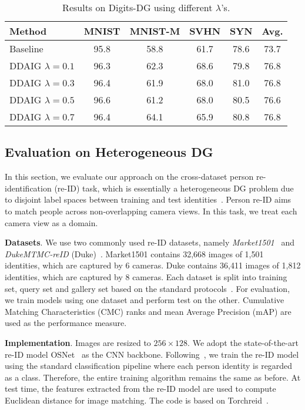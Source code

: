 \documentclass[letterpaper]{article}
\newcommand{\keypoint}[1]{\vspace{0.1cm}\noindent\textbf{#1}}
\newcommand{\tableCellHeight}{1.1}
\begin{document}
\begin{table}[t]
\setlength{\tabcolsep}{3.5pt}
\renewcommand{\arraystretch}{\tableCellHeight}
\centering
\footnotesize
\caption{Results on Digits-DG using different $\lambda$'s.}
\label{tab:impactOfLmda}
\begin{tabular}{l | c c c c | c}
\hline
Method & MNIST & MNIST-M & SVHN & SYN & Avg. \\
\hline
Baseline & 95.8 & 58.8 & 61.7 & 78.6 & 73.7 \\
DDAIG $\lambda=0.1$ & 96.3 & 62.3 & 68.6 & 79.8 & 76.8 \\
DDAIG $\lambda=0.3$ & 96.4 & 61.9 & 68.0 & 81.0 & 76.8 \\
DDAIG $\lambda=0.5$ & 96.6 & 61.2 & 68.0 & 80.5 & 76.6 \\
DDAIG $\lambda=0.7$ & 96.4 & 64.1 & 65.9 & 80.8 & 76.8 \\
\hline
\end{tabular}
\vspace{-0.3cm}
\end{table}

\subsection{Evaluation on Heterogeneous DG}
In this section, we evaluate our approach on the cross-dataset person re-identification (re-ID) task, which is essentially a heterogeneous DG problem due to disjoint label spaces between training and test identities~\cite{feature_critic}. Person re-ID aims to match people across non-overlapping camera views. In this task, we treat each camera view as a domain.

\keypoint{Datasets}.
We use two commonly used re-ID datasets, namely \emph{Market1501}~\cite{zheng2015scalable} and \emph{DukeMTMC-reID} (Duke)~\cite{ristani2016perform,zheng2017unlabeled}. Market1501 contains 32,668 images of 1,501 identities, which are captured by 6 cameras. Duke contains 36,411 images of 1,812 identities, which are captured by 8 cameras. Each dataset is split into training set, query set and gallery set based on the standard protocols~\cite{zheng2015scalable,zheng2017unlabeled}. For evaluation, we train models using one dataset and perform test on the other. Cumulative Matching Characteristics (CMC) ranks and mean Average Precision (mAP) are used as the performance measure.

\keypoint{Implementation}.
Images are resized to $256 \times 128$. We adopt the state-of-the-art re-ID model OSNet~\cite{zhou2019osnet,zhou2019learning} as the CNN backbone. Following~\cite{zhou2019osnet,zhou2019learning}, we train the re-ID model using the standard classification pipeline where each person identity is regarded as a class. Therefore, the entire training algorithm remains the same as before. At test time, the features extracted from the re-ID model are used to compute Euclidean distance for image matching. The code is based on Torchreid~\cite{torchreid}.
\end{document}
